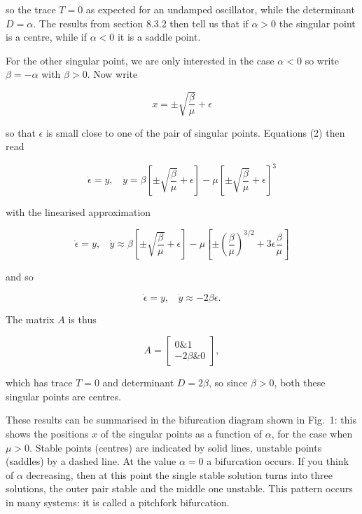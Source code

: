  \noindent{}so the trace $T=0$ as expected for an undamped oscillator, while 
  the determinant $D=\alpha$. The results from section 8.3.2 then tell us that 
  if $\alpha > 0$ the singular point is a centre, while if $\alpha < 0$ it is a 
  saddle point. 

  For the other singular point, we are only interested in the case $\alpha < 0$ 
  so write $\beta = -\alpha$ with $\beta > 0$. Now write 

  \begin{equation*}x=\pm \sqrt{\dfrac{\beta}{\mu}} + \epsilon 
  \tag{7}\end{equation*} 

  \noindent{}so that $\epsilon$ is small close to one of the pair of singular 
  points. Equations (2) then read 

  \begin{equation*}\dot{\epsilon}=y \mathrm{,~~~~} \dot{y}=\beta \left[\pm 
  \sqrt{\dfrac{\beta}{\mu}} + \epsilon \right] -\mu \left[\pm 
  \sqrt{\dfrac{\beta}{\mu}} + \epsilon\right]^3 \tag{8}\end{equation*} 

  \noindent{}with the linearised approximation 

  \begin{equation*}\dot{\epsilon}=y \mathrm{,~~~~} \dot{y} \approx \beta 
  \left[\pm \sqrt{\dfrac{\beta}{\mu}} + \epsilon \right] -\mu \left[\pm 
  \left(\dfrac{\beta}{\mu}\right)^{3/2} + 3\epsilon\dfrac{\beta}{\mu} \right] 
  \tag{9}\end{equation*} 

  \noindent{}and so 

  \begin{equation*}\dot{\epsilon}=y \mathrm{,~~~~} \dot{y} \approx -2 \beta 
  \epsilon . \tag{10}\end{equation*} 

  The matrix $A$ is thus 

  \begin{equation*}A=\begin{bmatrix}0 \& 1\\ -2\beta \& 0\end{bmatrix}, 
  \tag{11}\end{equation*} 

  \noindent{}which has trace $T=0$ and determinant $D=2\beta$, so since $\beta 
  > 0$, both these singular points are centres. 

  These results can be summarised in the bifurcation diagram shown in Fig.\ 1: 
  this shows the positions $x$ of the singular points as a function of 
  $\alpha$, for the case when $\mu > 0$. Stable points (centres) are indicated 
  by solid lines, unstable points (saddles) by a dashed line. At the value 
  $\alpha=0$ a bifurcation occurs. If you think of $\alpha$ decreasing, then at 
  this point the single stable solution turns into three solutions, the outer 
  pair stable and the middle one unstable. This pattern occurs in many systems: 
  it is called a pitchfork bifurcation. 

